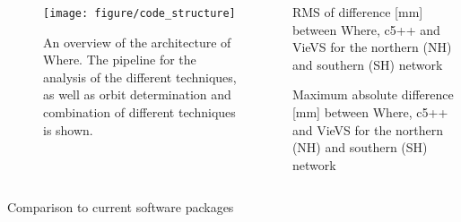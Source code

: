 \documentclass{beamer}
\begin{document}
\begin{frame}[t]
\begin{columns}
\begin{column}[t]{.48\textwidth}
      \begin{columns}
        \begin{column}[t]{.48\textwidth}
          \begin{figure}
            \texttt{[image: figure/code\_structure]}
            \caption{An overview of the architecture of Where. The pipeline for
              the analysis of the different techniques, as well as orbit
              determination and combination of different techniques is shown.}
            \label{fig:architecture}
          \end{figure}
        \end{column}

        \begin{column}[t]{.48\textwidth}
          \begin{table}
            
            \caption{RMS of difference [mm] between Where, c5++ and VieVS for
              the northern (NH) and southern (SH) network}
            \label{tbl:vascc_rms}
          \end{table}

          \begin{table}
            
            \caption{Maximum absolute difference [mm] between Where, c5++ and
              VieVS for the northern (NH) and southern (SH) network}
            \label{tbl:vascc_max}
          \end{table}
        \end{column}
      \end{columns}
    \end{column}
  \end{columns}

  \begin{columns}
    \begin{column}[t]{.98\textwidth}
      \begin{block}{Comparison to current software packages}
        \begin{multicols}{4}
          
        \end{multicols}
      \end{block}
    \end{column}
  \end{columns}


\end{frame}
\end{document}
